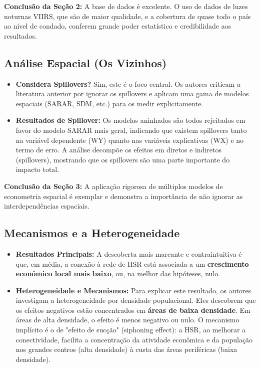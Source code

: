\documentclass[12pt, a4paper]{article}
\begin{document}
\noindent\textbf{Conclusão da Seção 2:} A base de dados é excelente. O uso de dados de luzes noturnas VIIRS, que são de maior qualidade, e a cobertura de quase todo o país ao nível de condado, conferem grande poder estatístico e credibilidade aos resultados.

\subsection{Análise Espacial (Os Vizinhos)}

\begin{itemize}
    \item \textbf{Considera Spillovers?} Sim, este é o foco central. Os autores criticam a literatura anterior por ignorar os spillovers e aplicam uma gama de modelos espaciais (SARAR, SDM, etc.) para os medir explicitamente.
    \item \textbf{Resultados de Spillover:} Os modelos aninhados são todos rejeitados em favor do modelo SARAR mais geral, indicando que existem spillovers tanto na variável dependente (WY) quanto nas variáveis explicativas (WX) e no termo de erro. A análise decompõe os efeitos em diretos e indiretos (spillovers), mostrando que os spillovers são uma parte importante do impacto total.
\end{itemize}

\noindent\textbf{Conclusão da Seção 3:} A aplicação rigorosa de múltiplos modelos de econometria espacial é exemplar e demonstra a importância de não ignorar as interdependências espaciais.

\subsection{Mecanismos e a Heterogeneidade}

\begin{itemize}
    \item \textbf{Resultados Principais:} A descoberta mais marcante e contraintuitiva é que, em média, a conexão à rede de HSR está associada a um \textbf{crescimento económico local mais baixo}, ou, na melhor das hipóteses, nulo.
    \item \textbf{Heterogeneidade e Mecanismos:} Para explicar este resultado, os autores investigam a heterogeneidade por densidade populacional. Eles descobrem que os efeitos negativos estão concentrados em \textbf{áreas de baixa densidade}. Em áreas de alta densidade, o efeito é menos negativo ou nulo. O mecanismo implícito é o de "efeito de sucção" (siphoning effect): a HSR, ao melhorar a conectividade, facilita a concentração da atividade econômica e da população nos grandes centros (alta densidade) à custa das áreas periféricas (baixa densidade).
\end{itemize}
\end{document}
